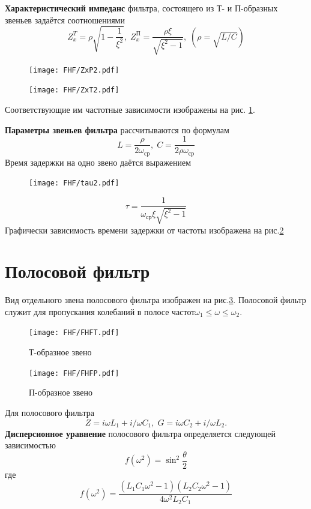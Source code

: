 \textbf{Характеристический импеданс} фильтра, состоящего из Т- и П-образных звеньев задаётся соотношениями
\begin{equation}
Z^T_x=\rho\sqrt{1-\frac{1}{\xi^2}},\;
Z^{\text{П}}_x=\frac{\rho\xi}{\sqrt{\xi^2-1}},\;
(\rho=\sqrt{L/C})
\end{equation}
\begin{figure}[h!]
	\begin{minipage}{0.49\linewidth}
		\centering
		\texttt{[image: FHF/ZxP2.pdf]}
	\end{minipage}
	\begin{minipage}{0.49\linewidth}
		\centering
		\texttt{[image: FHF/ZxT2.pdf]}
	\end{minipage}
	\caption{}
	\label{fig:6.3}
\end{figure}
Соответствующие им частотные зависимости изображены на рис. \ref{fig:6.3}.

\textbf{Параметры звеньев фильтра} рассчитываются по формулам
\begin{equation}
\label{eq:6.5}
L=\frac{\rho}{2\omega_{\text{ср}}},\;
C=\frac{1}{2\rho\omega_{\text{ср}}}
\end{equation}
Время задержки на одно звено даётся выражением
\begin{figure}[h!]
	\centering
	\texttt{[image: FHF/tau2.pdf]}
	\caption{}
	\label{fig:6.4}
\end{figure}
\begin{equation}
\label{eq:6.6}
\tau=\frac{1}{\omega_{\text{ср}}\xi\sqrt{\xi^2-1}}
\end{equation}
Графически зависимость времени задержки от частоты изображена на рис.\ref{fig:6.4}
\section{Полосовой фильтр}
Вид отдельного звена полосового фильтра изображен на рис.\ref{fig:7.1}. Полосовой фильтр служит для пропускания колебаний в полосе частот$\omega_1\leq\omega\leq\omega_2$.
\begin{figure}[h!]
	\begin{minipage}{0.49\linewidth}
		\centering
		\texttt{[image: FHF/FHFT.pdf]}
		\caption*{Т-образное звено}
	\end{minipage}
	\begin{minipage}{0.49\linewidth}
		\centering
		\texttt{[image: FHF/FHFP.pdf]}
		\caption*{П-образное звено}
	\end{minipage}
	\caption{}
	\label{fig:7.1}
\end{figure}
Для полосового фильтра
\begin{equation}
\label{eq:7.1}
Z=i\omega L_1+i/\omega C_1,\;G=i\omega C_2+i/\omega L_2.
\end{equation}
\textbf{Дисперсионное уравнение} полосового фильтра определяется следующей зависимостью
\begin{equation}
	\label{eq:7.2}
	f(\omega^2)=\sin^2\frac{\theta}{2}
\end{equation}
где
\begin{equation}
	\label{eq:7.3}
	f(\omega^2)=\frac{(L_1C_1\omega^2-1)(L_2C_2\omega^2-1)}{4\omega^2L_2C_1}
\end{equation}

